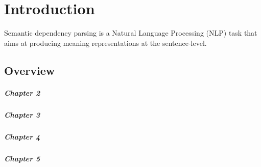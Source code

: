\chapter{Introduction}
\label{chap:introduction}

Semantic dependency parsing is a Natural Language Processing (NLP) task that aims at producing meaning representations at the sentence-level. 

\section{Overview} 

\paragraph{Chapter 2} 

\paragraph{Chapter 3} 

\paragraph{Chapter 4} 

\paragraph{Chapter 5} 